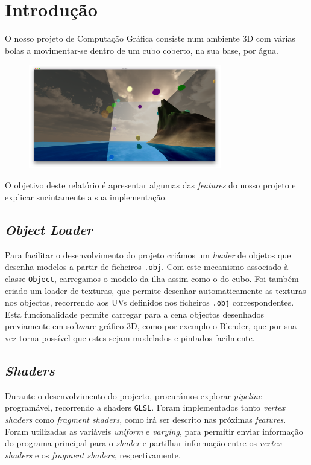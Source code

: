 \documentclass[12pt]{article}
\title{\TitleFont{Computação Gráfica}}
\author{David Gomes (2013136061) \and \vspace{-0.1cm} André Baptista (2012137523)}
\date{}
\begin{document}
\maketitle

\section*{Introdução}
O nosso projeto de Computação Gráfica consiste num ambiente 3D com várias bolas a movimentar-se
dentro de um cubo coberto, na sua base, por água.

\begin{figure}[H]
  \centering
  \includegraphics[width=0.75\textwidth]{screenshot}
\end{figure}

O objetivo deste relatório é apresentar algumas das \textit{features} do nosso projeto e explicar sucintamente a sua implementação.

\pagebreak

\subsection*{\textit{Object Loader}}
Para facilitar o desenvolvimento do projeto criámos um \textit{loader} de objetos que desenha modelos
a partir de ficheiros \texttt{.obj}. Com este mecanismo associado à classe \texttt{Object}, carregamos o modelo da ilha assim como o do cubo. Foi também criado um loader de texturas, que permite desenhar automaticamente as texturas nos objectos, recorrendo aos UVs definidos nos ficheiros \texttt{.obj} correspondentes. Esta funcionalidade permite carregar para a cena objectos desenhados previamente em software gráfico 3D, como por exemplo o Blender, que por sua vez torna possível que estes sejam modelados e pintados facilmente.

\subsection*{\textit{Shaders}}
Durante o desenvolvimento do projecto, procurámos explorar \textit{pipeline} programável, recorrendo a shaders \texttt{GLSL}. Foram implementados tanto \textit{vertex shaders} como \textit{fragment shaders}, como irá ser descrito nas próximas \textit{features}. Foram utilizadas as variáveis \textit{uniform} e \textit{varying}, para permitir enviar informação do programa principal para o \textit{shader} e partilhar informação entre os \textit{vertex shaders} e os \textit{fragment shaders}, respectivamente.
\end{document}
